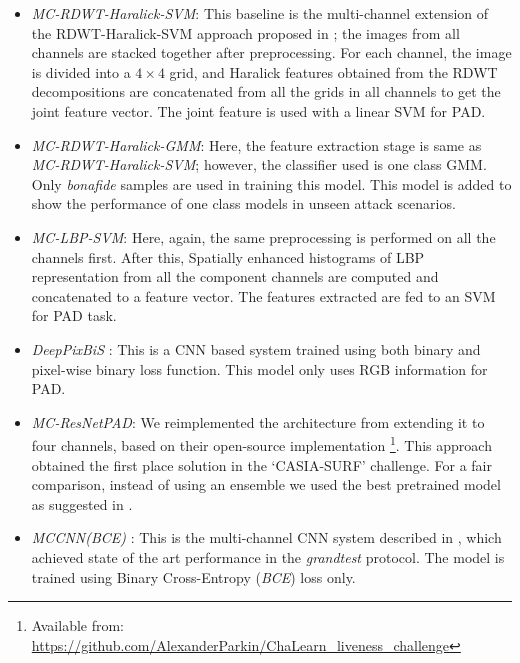 \documentclass[journal]{IEEEtran}
\begin{document}
\begin{itemize}

\item \textit{MC-RDWT-Haralick-SVM}: This baseline is the multi-channel extension of the RDWT-Haralick-SVM approach proposed in \cite{agarwal2017face}; the images from all channels are stacked together after preprocessing. For each channel, the image is divided into a  $4 \times 4$ grid, and Haralick \cite{haralick1979statistical} features obtained from the RDWT decompositions are concatenated from all the grids in all channels to get the joint feature vector. The joint feature is used with a linear SVM for PAD.

\item \textit{MC-RDWT-Haralick-GMM}: Here, the feature extraction stage is same as \textit{MC-RDWT-Haralick-SVM}; however, the classifier used is one class GMM. Only \textit{bonafide} samples are used in training this model. This model is added to show the performance of one class models in unseen attack scenarios.

\item \textit{MC-LBP-SVM}: Here, again, the same preprocessing is performed on all the channels first. After this, Spatially enhanced histograms of LBP representation from all the component channels are computed and concatenated to a feature vector. The features extracted are fed to an SVM for PAD task.

\item \textit{DeepPixBiS} :  This is a CNN based system \cite{george2019deep} trained using both binary and pixel-wise binary loss function. This model only uses RGB information for PAD.

\item \textit{MC-ResNetPAD}: We reimplemented the architecture from \cite{parkin2019recognizing} extending it to four channels, based on their open-source implementation \footnote{Available from: \url{https://github.com/AlexanderParkin/ChaLearn_liveness_challenge}}. This approach obtained the first place solution in the `CASIA-SURF' challenge. For a fair comparison, instead of using an ensemble we used the best pretrained model as suggested in \cite{parkin2019recognizing}.

\item \textit{MCCNN(BCE)} : This is the multi-channel CNN system described in \cite{george_mccnn_tifs2019}, which achieved state of the art performance in the \textit{grandtest} protocol. The model is trained using Binary Cross-Entropy (\textit{BCE}) loss only.
\end{itemize}
\end{document}
